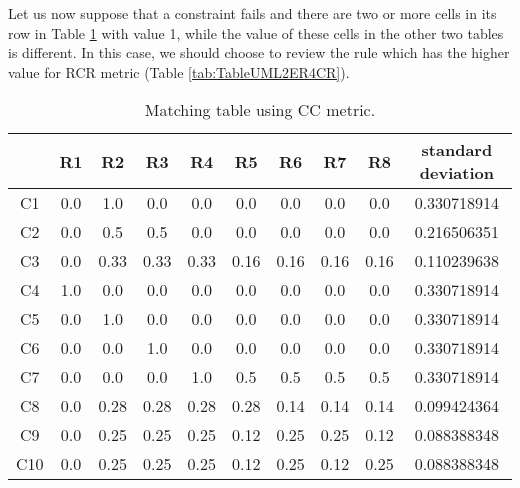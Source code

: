 Let us now suppose that a constraint fails and there are two or more cells in its row in Table \ref{tab:TableUML2ER4C} with value 1, while the value of these cells in the other two tables is different. In this case, we should choose to review the rule which has the higher value for RCR metric (Table \ref{tab:TableUML2ER4CR}).

\begin{table}[!h]
\centering
\caption{Matching table using CC metric.}
\begin{tabular}{c|c|c|c|c|c|c|c|c|c|} \cline{2-10}
&R1&R2&R3&R4&R5&R6&R7&R8&standard deviation\\ \hline
\multicolumn{1}{|c|}{C1}&0.0&1.0&0.0&0.0&0.0&0.0&0.0&0.0&0.330718914\\ \hline
\multicolumn{1}{|c|}{C2}&0.0&0.5&0.5&0.0&0.0&0.0&0.0&0.0&0.216506351\\ \hline
\multicolumn{1}{|c|}{C3}&0.0&0.33&0.33&0.33&0.16&0.16&0.16&0.16&0.110239638\\ \hline
\multicolumn{1}{|c|}{C4}&1.0&0.0&0.0&0.0&0.0&0.0&0.0&0.0&0.330718914\\ \hline
\multicolumn{1}{|c|}{C5}&0.0&1.0&0.0&0.0&0.0&0.0&0.0&0.0&0.330718914\\ \hline
\multicolumn{1}{|c|}{C6}&0.0&0.0&1.0&0.0&0.0&0.0&0.0&0.0&0.330718914\\ \hline
\multicolumn{1}{|c|}{C7}&0.0&0.0&0.0&1.0&0.5&0.5&0.5&0.5&0.330718914\\ \hline
\multicolumn{1}{|c|}{C8}&0.0&0.28&0.28&0.28&0.28&0.14&0.14&0.14&0.099424364\\ \hline
\multicolumn{1}{|c|}{C9}&0.0&0.25&0.25&0.25&0.12&0.25&0.25&0.12&0.088388348\\ \hline
\multicolumn{1}{|c|}{C10}&0.0&0.25&0.25&0.25&0.12&0.25&0.12&0.25&0.088388348\\ \hline
\end{tabular}
\label{tab:TableUML2ER4C}
\end{table}

